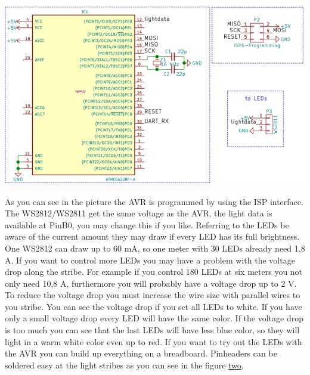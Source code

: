 \begin{DoxyImage}
\includegraphics[width=\textwidth,height=\textheight/2,keepaspectratio=true]{Ws2811_Atmega328_schematic.png}
\caption{schematic of the A\+V\+R to controll W\+S2812/\+W\+S2811}
\end{DoxyImage}
 As you can see in the picture the A\+V\+R is programmed by using the I\+S\+P interface. The W\+S2812/\+W\+S2811 get the same voltage as the A\+V\+R, the light data is available at Pin\+B0, you may change this if you like. Referring to the L\+E\+Ds be aware of the current amount they may draw if every L\+E\+D has its full brightness. One W\+S2812 can draw up to 60 m\+A, so one meter with 30 L\+E\+Ds already need 1,8 A. If you want to control more L\+E\+Ds you may have a problem with the voltage drop along the stribe. For example if you control 180 L\+E\+Ds at six meters you not only need 10,8 A, furthermore you will probably have a voltage drop up to 2 V. To reduce the voltage drop you must increase the wire size with parallel wires to you stribe. You can see the voltage drop if you set all L\+E\+Ds to white. If you have only a small voltage drop every L\+E\+D will have the same color. If the voltage drop is too much you can see that the last L\+E\+Ds will have less blue color, so they will light in a warm white color even up to red. If you want to try out the L\+E\+Ds with the A\+V\+R you can build up everything on a breadboard. Pinheaders can be soldered easy at the light stribes as you can see in the figure \hyperlink{index_two}{two}. \label{index_two}%
\hypertarget{index_two}{}%

